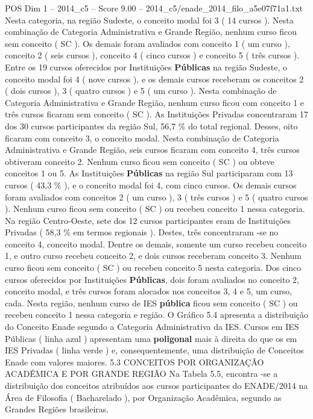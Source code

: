 \begin{textsample}{POS Dim 1 – 2014\_c5 – Score 9.00 – 2014\_c5/enade\_2014\_filo\_a5e07f71a1.txt}
Nesta categoria, na região Sudeste, o conceito modal foi 3 ( 14 cursos ).
Nesta combinação de Categoria Administrativa e Grande Região, nenhum curso ficou sem conceito ( SC ).
Os demais foram avaliados com conceito 1 ( um curso ), conceito 2 ( seis cursos ), conceito 4 ( cinco cursos ) e conceito 5 ( três cursos ).
Entre os 19 cursos oferecidos por Instituições \textbf{Públicas} na região Sudeste, o conceito modal foi 4 ( nove cursos ), e os demais cursos receberam os conceitos 2 ( dois cursos ), 3 ( quatro cursos ) e 5 ( um curso ).
Nesta combinação de Categoria Administrativa e Grande Região, nenhum curso ficou com conceito 1 e três cursos ficaram sem conceito ( SC ).
As Instituições Privadas concentraram 17 dos 30 cursos participantes da região Sul, 56,7 \% do total regional.
Desses, oito ficaram com conceito 3, o conceito modal.
Nesta combinação de Categoria Administrativa e Grande Região, seis cursos ficaram com conceito 4, três cursos obtiveram conceito 2.
Nenhum curso ficou sem conceito ( SC ) ou obteve conceitos 1 ou 5.
As Instituições \textbf{Públicas} na região Sul participaram com 13 cursos ( 43,3 \% ), e o conceito modal foi 4, com cinco cursos.
Os demais cursos foram avaliados com conceitos 2 ( um curso ), 3 ( três cursos ) e 5 ( quatro cursos ).
Nenhum curso ficou sem conceito ( SC ) ou recebeu conceito 1 nessa categoria.
Na região Centro-Oeste, sete dos 12 cursos participantes eram de Instituições Privadas ( 58,3 \% em termos regionais ).
Destes, três concentraram -se no conceito 4, conceito modal.
Dentre os demais, somente um curso recebeu conceito 1, e outro curso recebeu conceito 2, e dois cursos receberam conceito 3.
Nenhum curso ficou sem conceito ( SC ) ou recebeu conceito 5 nesta categoria.
Dos cinco cursos oferecidos por Instituições \textbf{Públicas}, dois foram avaliados no conceito 2, conceito modal, e três cursos foram alocados nos conceitos 3, 4 e 5, um curso, cada.
Nesta região, nenhum curso de IES \textbf{pública} ficou sem conceito ( SC ) ou recebeu conceito 1 nessa categoria e região.
O Gráfico 5.4 apresenta a distribuição do Conceito Enade segundo a Categoria Administrativa da IES.
Cursos em IES Públicas ( linha azul ) apresentam uma \textbf{poligonal} mais à direita do que os em IES Privadas ( linha verde ) e, consequentemente, uma distribuição de Conceitos Enade com valores maiores. 5.3 CONCEITOS POR ORGANIZAÇÃO ACADÊMICA E POR GRANDE REGIÃO Na Tabela 5.5, encontra -se a distribuição dos conceitos atribuídos aos cursos participantes do ENADE/2014 na Área de Filosofia ( Bacharelado ), por Organização Acadêmica, segundo as Grandes Regiões brasileiras.

\end{textsample}
